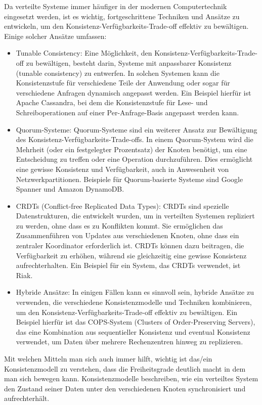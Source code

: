 \documentclass[../vs-script-first-v01.tex]{subfiles}
\begin{document}
Da verteilte Systeme immer häufiger in der modernen Computertechnik eingesetzt werden, ist es wichtig, fortgeschrittene Techniken und Ansätze zu entwickeln, um den Konsistenz-Verfügbarkeits-Trade-off effektiv zu bewältigen. Einige solcher Ansätze umfassen:
\begin{itemize}
\item Tunable Consistency: Eine Möglichkeit, den Konsistenz-Verfügbarkeits-Trade-off zu bewältigen, besteht darin, Systeme mit anpassbarer Konsistenz (tunable consistency) zu entwerfen. In solchen Systemen kann die Konsistenzstufe für verschiedene Teile der Anwendung oder sogar für verschiedene Anfragen dynamisch angepasst werden. Ein Beispiel hierfür ist Apache Cassandra, bei dem die Konsistenzstufe für Lese- und Schreiboperationen auf einer Per-Anfrage-Basis angepasst werden kann.
\item Quorum-Systeme: Quorum-Systeme sind ein weiterer Ansatz zur Bewältigung des Konsistenz-Verfügbarkeits-Trade-offs. In einem Quorum-System wird die Mehrheit (oder ein festgelegter Prozentsatz) der Knoten benötigt, um eine Entscheidung zu treffen oder eine Operation durchzuführen. Dies ermöglicht eine gewisse Konsistenz und Verfügbarkeit, auch in Anwesenheit von Netzwerkpartitionen. Beispiele für Quorum-basierte Systeme sind Google Spanner und Amazon DynamoDB.
\item CRDTs (Conflict-free Replicated Data Types): CRDTs sind spezielle Datenstrukturen, die entwickelt wurden, um in verteilten Systemen repliziert zu werden, ohne dass es zu Konflikten kommt. Sie ermöglichen das Zusammenführen von Updates aus verschiedenen Knoten, ohne dass ein zentraler Koordinator erforderlich ist. CRDTs können dazu beitragen, die Verfügbarkeit zu erhöhen, während sie gleichzeitig eine gewisse Konsistenz aufrechterhalten. Ein Beispiel für ein System, das CRDTs verwendet, ist Riak.
\item Hybride Ansätze: In einigen Fällen kann es sinnvoll sein, hybride Ansätze zu verwenden, die verschiedene Konsistenzmodelle und Techniken kombinieren, um den Konsistenz-Verfügbarkeits-Trade-off effektiv zu bewältigen. Ein Beispiel hierfür ist das COPS-System (Clusters of Order-Preserving Servers), das eine Kombination aus sequentieller Konsistenz und eventual Konsistenz verwendet, um Daten über mehrere Rechenzentren hinweg zu replizieren.
\end{itemize}
Mit welchen Mitteln man sich auch immer hilft, wichtig ist das/ein Konsistenzmodell zu verstehen, dass die Freiheitsgrade deutlich macht in dem man sich bewegen kann. Konsistenzmodelle beschreiben, wie ein verteiltes System den Zustand seiner Daten unter den verschiedenen Knoten synchronisiert und aufrechterhält. 
\end{document}
